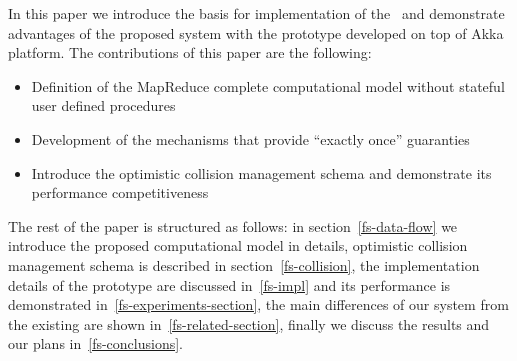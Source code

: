 In this paper we introduce the basis for implementation of the \FlameStream\ and demonstrate advantages of the proposed system with the prototype developed on top of Akka platform. The contributions of this paper are the following:

\begin {itemize}
\item Definition of the MapReduce complete computational model without stateful user defined procedures
\item Development of the mechanisms that provide ``exactly once'' guaranties
\item Introduce the optimistic collision management schema and demonstrate its performance competitiveness
\end {itemize}

The rest of the paper is structured as follows: in section~\ref{fs-data-flow} we introduce the proposed computational model in details, optimistic collision management schema is described in section~\ref{fs-collision}, the implementation details of the prototype are discussed in~\ref{fs-impl} and its performance is demonstrated in~\ref{fs-experiments-section}, the main differences of our system from the existing are shown in~\ref{fs-related-section}, finally we discuss the results and our plans in~\ref{fs-conclusions}.

\endinput
